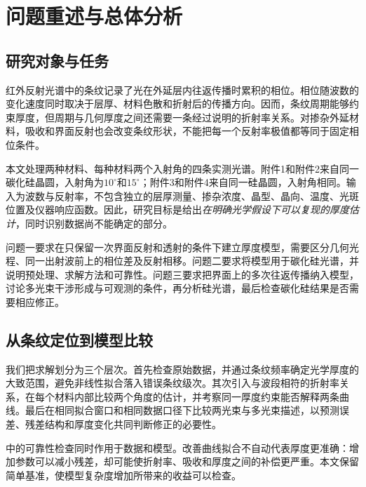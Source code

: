\section{问题重述与总体分析}
\subsection{研究对象与任务}
红外反射光谱中的条纹记录了光在外延层内往返传播时累积的相位。相位随波数的变化速度同时取决于层厚、材料色散和折射后的传播方向。因而，条纹周期能够约束厚度，但周期与几何厚度之间还需要一条经过说明的折射率关系。对掺杂外延材料，吸收和界面反射也会改变条纹形状，不能把每一个反射率极值都等同于固定相位条件。

本文处理两种材料、每种材料两个入射角的四条实测光谱。附件1和附件2来自同一碳化硅晶圆，入射角为$10^\circ$和$15^\circ$；附件3和附件4来自同一硅晶圆，入射角相同。输入为波数与反射率，不包含独立的层厚测量、掺杂浓度、晶型、晶向、温度、光斑位置及仪器响应函数。因此，研究目标是给出\emph{在明确光学假设下可以复现的厚度估计}，同时识别数据尚不能确定的部分。

问题一要求在只保留一次界面反射和透射的条件下建立厚度模型，需要区分几何光程、同一出射波前上的相位差及反射相移。问题二要求将模型用于碳化硅光谱，并说明预处理、求解方法和可靠性。问题三要求把界面上的多次往返传播纳入模型，讨论多光束干涉形成与可观测的条件，再分析硅光谱，最后检查碳化硅结果是否需要相应修正。

\subsection{从条纹定位到模型比较}
我们把求解划分为三个层次。首先检查原始数据，并通过条纹频率确定光学厚度的大致范围，避免非线性拟合落入错误条纹级次。其次引入与波段相符的折射率关系，在每个材料内部比较两个角度的估计，并考察同一厚度约束能否解释两条曲线。最后在相同拟合窗口和相同数据口径下比较两光束与多光束描述，以预测误差、残差结构和厚度变化共同判断修正的必要性。

中的可靠性检查同时作用于数据和模型。改善曲线拟合不自动代表厚度更准确：增加参数可以减小残差，却可能使折射率、吸收和厚度之间的补偿更严重。本文保留简单基准，使模型复杂度增加所带来的收益可以检查。

